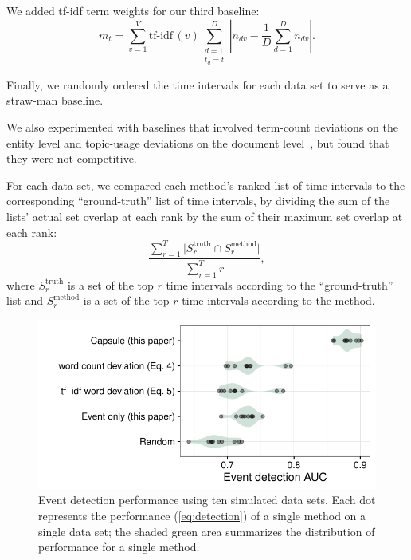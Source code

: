 We added tf-idf term weights for our third baseline:
\begin{equation}
  m_t = \sum_{v=1}^V \textrm{tf-idf}\,(v) \sum_{\substack{d=1\\t_d\!=\!t}}^D \left\lvert n_{dv} - \frac{1}{D}\sum_{d=1}^D
  n_{dv} \right\rvert.
\label{eq:tfidfwordev}
\end{equation}

Finally, we randomly ordered the time intervals for each data set to
serve as a straw-man baseline.

We also experimented with baselines that involved term-count
deviations on the entity level and topic-usage deviations on the
document level~\cite{dou2012leadline}, but found that they were not
competitive.

For each data set, we compared each method's ranked list of time
intervals to the corresponding ``ground-truth'' list of time
intervals, by dividing the sum of the lists' actual set overlap at
each rank by the sum of their maximum set overlap at each rank:
\begin{equation}
\frac{\sum_{r=1}^T \vert S^{\textrm{truth}}_r \cap
  S^{\textrm{method}}_r \vert}{\sum_{r=1}^T r},
\label{eq:detection}
\end{equation}
where $S^{\textrm{truth}}_r$ is a set of the top $r$ time intervals
according to the ``ground-truth'' list and $S^{\textrm{method}}_r$ is
a set of the top $r$ time intervals according to the method.

\begin{figure}[t]
\centering
\includegraphics[width=\linewidth]{fig/sim_eventdetect.pdf}
\caption{Event detection performance using ten simulated data
  sets. Each dot represents the performance (\cref{eq:detection}) of
  a single method on a single data set; the shaded green area
  summarizes the distribution of performance for a single method.}
\label{fig:sim_eventdetect}
\end{figure}


